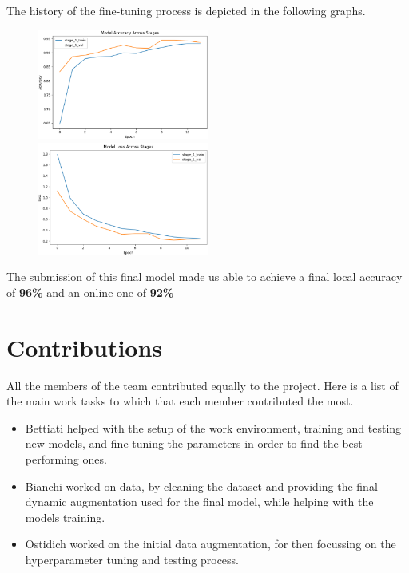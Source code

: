 \documentclass[11pt]{article}
\begin{document}
\begin{multicols}{2}
        The history of the fine-tuning process is depicted in the following graphs.
        
        \begin{figure}[h!]
            \centering
            \includegraphics[width=0.5\textwidth]{images/final_accuracy.png}
            \includegraphics[width=0.5\textwidth]
            {images/final_loss.png}
        \end{figure}
        
        The submission of this final model made us able to achieve a final local accuracy of \textbf{96\%} and an online one of \textbf{92\%}
        
        \section{Contributions}
        
        All the members of the team contributed equally to the project. 
        Here is a list of the main work tasks to which that each member contributed the most.
        
        \begin{itemize}
            \item Bettiati helped with the setup of the work environment, training and testing new models, and fine tuning the parameters in order to find the best performing ones.
            \item Bianchi worked on data, by cleaning the dataset and providing the final dynamic augmentation used for the final model, while helping with the models training.
            \item Ostidich worked on the initial data augmentation, for then focussing on the hyperparameter tuning and testing process.
        \end{itemize}
        
        
        
        
    \end{multicols}
\end{document}
